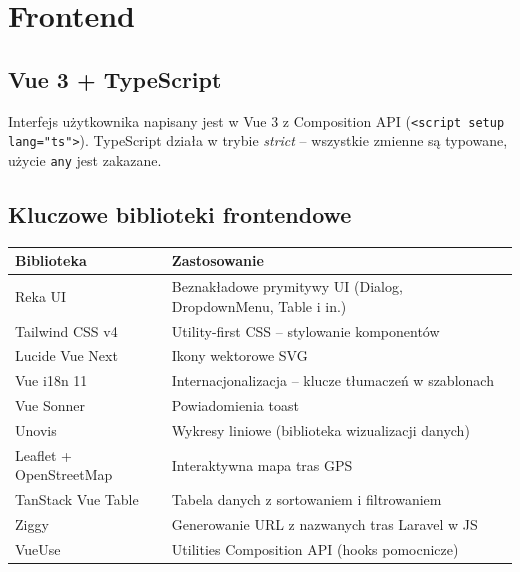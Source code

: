 \documentclass[12pt,a4paper]{report}
\begin{document}
\section{Frontend}

\subsection{Vue 3 + TypeScript}

Interfejs użytkownika napisany jest w Vue 3 z Composition API (\texttt{<script setup lang="ts">}). TypeScript działa w trybie \textit{strict} -- wszystkie zmienne są typowane, użycie \texttt{any} jest zakazane.

\subsection{Kluczowe biblioteki frontendowe}

\begin{center}
\begin{longtable}{|l|p{8cm}|}
\hline
\textbf{Biblioteka}       & \textbf{Zastosowanie}                              \\
\hline
Reka UI                   & Beznakładowe prymitywy UI (Dialog, DropdownMenu, Table i in.) \\
\hline
Tailwind CSS v4           & Utility-first CSS -- stylowanie komponentów       \\
\hline
Lucide Vue Next           & Ikony wektorowe SVG                               \\
\hline
Vue i18n 11               & Internacjonalizacja -- klucze tłumaczeń w szablonach \\
\hline
Vue Sonner                & Powiadomienia toast                               \\
\hline
Unovis                    & Wykresy liniowe (biblioteka wizualizacji danych)  \\
\hline
Leaflet + OpenStreetMap   & Interaktywna mapa tras GPS                        \\
\hline
TanStack Vue Table        & Tabela danych z sortowaniem i filtrowaniem        \\
\hline
Ziggy                     & Generowanie URL z nazwanych tras Laravel w JS     \\
\hline
VueUse                    & Utilities Composition API (hooks pomocnicze)      \\
\hline
\end{longtable}
\end{center}
\end{document}
